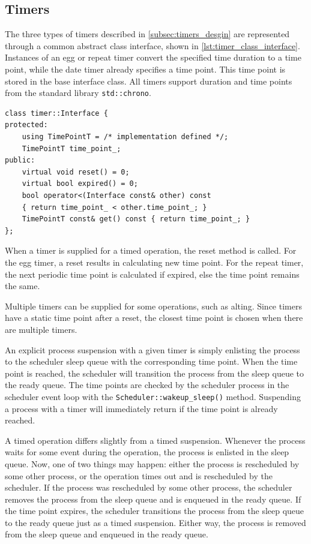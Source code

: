 \subsection{Timers}


The three types of timers described in \cref{subsec:timers_desgin} are represented through a common abstract class interface, shown in \cref{lst:timer_class_interface}. Instances of an egg or repeat timer convert the specified time duration to a time point, while the date timer already specifies a time point. This time point is stored in the base interface class. All timers support duration and time points from the standard library \lstinline[style={CustomC++}]|std::chrono|.

\begin{lstfloat}
\begin{lstlisting}[caption={Timer abstract class interface.}, label={lst:timer_class_interface}, style={CustomC++}, xleftmargin={2em}]
class timer::Interface {
protected:
    using TimePointT = /* implementation defined */;
    TimePointT time_point_;
public:
    virtual void reset() = 0;
    virtual bool expired() = 0;
    bool operator<(Interface const& other) const 
    { return time_point_ < other.time_point_; }
    TimePointT const& get() const { return time_point_; }
};
\end{lstlisting}
\end{lstfloat}

When a timer is supplied for a timed operation, the reset method is called. For the egg timer, a reset results in calculating new time point. For the repeat timer, the next periodic time point is calculated if expired, else the time point remains the same.

Multiple timers can be supplied for some operations, such as alting. Since timers have a static time point after a reset, the closest time point is chosen when there are multiple timers.

An explicit process suspension with a given timer is simply enlisting the process to the scheduler sleep queue with the corresponding time point. When the time point is reached, the scheduler will transition the process from the sleep queue to the ready queue. The time points are checked by the scheduler process in the scheduler event loop with the \texttt{Scheduler::wakeup\_sleep()} method. Suspending a process with a timer will immediately return if the time point is already reached.

A timed operation differs slightly from a timed suspension. Whenever the process waits for some event during the operation, the process is enlisted in the sleep queue. Now, one of two things may happen: either the process is rescheduled by some other process, or the operation times out and is rescheduled by the scheduler. If the process was rescheduled by some other process, the scheduler removes the process from the sleep queue and is enqueued in the ready queue. If the time point expires, the scheduler transitions the process from the sleep queue to the ready queue just as a timed suspension. Either way, the process is removed from the sleep queue and enqueued in the ready queue.

